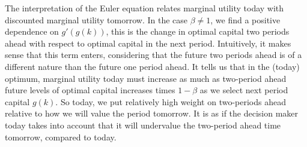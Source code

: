 \begin{questions}
\begin{solution}
The interpretation of the Euler equation relates marginal utility today with discounted marginal utility tomorrow. In the case $\beta \neq 1$, we find a positive dependence on $g'(g(k))$, this is the change in optimal capital two periods ahead with respect to optimal capital in the next period. Intuitively, it makes sense that this term enters, considering that the future two periods ahead is of a different nature than the future one period ahead. It tells us that in the (today) optimum, marginal utility today must increase as much as two-period ahead future levels of optimal capital increases times $1-\beta$ as we select next period capital $g(k)$. So today, we put relatively high weight on two-periods ahead relative to how we will value the period tomorrow. It is as if the decision maker today takes into account that it will undervalue the two-period ahead time tomorrow, compared to today.

\end{solution}


\end{questions}




